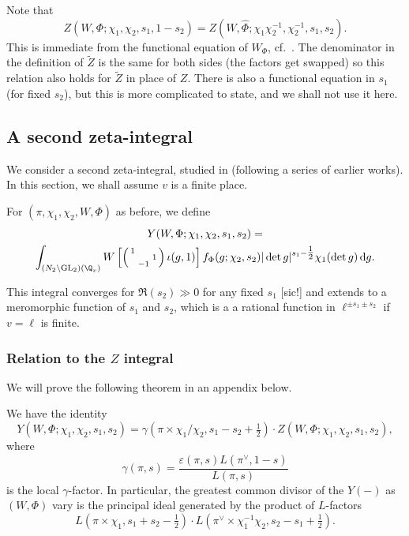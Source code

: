 \documentclass[10pt,reqno,a4paper]{amsart}
\newcommand{\GL}{\mathrm{GL}}
\newcommand{\smallthreemat}[9]{\left(\begin{smallmatrix}
#1 & #2 & #3 \\
#4 & #5 & #6 \\
#7 & #8 & #9\end{smallmatrix}\right)}
\begin{document}
Note that
\[ Z(W, \Phi; \chi_1, \chi_2, s_1, 1-s_2) = Z(W, \hat\Phi; \chi_1 \chi_2^{-1}, \chi_2^{-1}, s_1, s_2). \]
This is immediate from the functional equation of $W_{\Phi}$, cf.~\cite[Eq. (8.1)]{LPSZ19}. The denominator in the definition of $\widetilde{Z}$ is the same for both sides (the factors get swapped) so this relation also holds for $\widetilde{Z}$ in place of $Z$. There is also a functional equation in $s_1$ (for fixed $s_2$), but this is more complicated to state, and we shall not use it here.

\subsection{A second zeta-integral}\label{sec:second zeta integral}

We consider a second zeta-integral, studied in \cite{LSZ-unitary} (following a series of earlier works). In this section, we shall assume $v$ is a finite place.

\begin{definition}\label{def:local zeta Y}
For $(\pi, \chi_1, \chi_2, W, \Phi)$ as before, we define
\begin{multline*}
	Y(W, \Phi; \chi_1, \chi_2, s_1, s_2) = \\
	\int_{(N_2 \backslash \GL_2)(\Q_v)}
	W\left[ \smallthreemat{1}{}{}{}{}{1}{}{-1}{} \iota(g, 1) \right] f_{\Phi}(g; \chi_2, s_2) |\det g|^{s_1 - \tfrac{1}{2}}\chi_1(\det g)\, \mathrm{d}g.
\end{multline*}
\end{definition}

This integral converges for $\Re(s_2) \gg 0$ for any fixed $s_1$ [sic!] and extends to a meromorphic function of $s_1$ and $s_2$, which is a a rational function in $\ell^{\pm s_1 \pm s_2}$ if $v = \ell$ is finite.

\subsubsection{Relation to the $Z$ integral}  We will prove the following theorem in an appendix below.

\begin{theorem}
\label{thm:lfactor}
We have the identity
\[ Y(W, \Phi; \chi_1, \chi_2, s_1, s_2) = \gamma(\pi \times \chi_1/\chi_2, s_1 - s_2 + \tfrac{1}{2})\cdot  Z(W, \Phi; \chi_1, \chi_2, s_1, s_2), \]
where
\[ \gamma(\pi, s) = \frac{\varepsilon(\pi, s) L(\pi^\vee, 1-s)}{L(\pi, s)}\]
is the local $\gamma$-factor. In particular, the greatest common divisor of the $Y(-)$ as $(W, \Phi)$ vary is the principal ideal generated by the product of $L$-factors
\[
L(\pi \times \chi_1, s_1 + s_2 - \tfrac{1}{2}) \cdot L(\pi^\vee \times \chi_1^{-1} \chi_2, s_2 - s_1 + \tfrac{1}{2}).
\]
\end{theorem}
\end{document}

